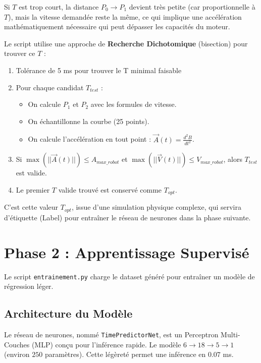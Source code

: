 \documentclass[12pt]{report}
\theoremstyle{plain}
\begin{document}
Si $T$ est trop court, la distance $P_0 \rightarrow P_1$ devient très petite (car proportionnelle à $T$), mais la vitesse demandée reste la même, ce qui implique une accélération mathématiquement nécessaire qui peut dépasser les capacités du moteur.

Le script utilise une approche de \textbf{Recherche Dichotomique} (bisection) pour trouver ce $T$ :

\begin{enumerate}
    \item Tolérance de 5 ms pour trouver le T minimal faisable
    \item Pour chaque candidat $T_{test}$ :
    \begin{itemize}
        \item On calcule $P_1$ et $P_2$ avec les formules de vitesse.
        \item On échantillonne la courbe (25 points).
        \item On calcule l'accélération en tout point : $\vec{A}(t) = \frac{d^2B}{dt^2}$.
    \end{itemize}
    \item Si $\max(||\vec{A}(t)||) \leq A_{max\_robot}$ et $\max(||\vec{V}(t)||) \leq V_{max\_robot}$, alors $T_{test}$ est valide.
    \item Le premier $T$ valide trouvé est conservé comme $T_{opt}$.
\end{enumerate}

C'est cette valeur $T_{opt}$, issue d'une simulation physique complexe, qui servira d'étiquette (Label) pour entraîner le réseau de neurones dans la phase suivante.
















\chapter{Phase 2 : Apprentissage Supervisé}

Le script \texttt{entrainement.py} charge le dataset généré pour entraîner un modèle de régression léger.

\section{Architecture du Modèle}
Le réseau de neurones, nommé \texttt{TimePredictorNet}, est un Perceptron Multi-Couches (MLP) conçu pour l'inférence rapide. Le modèle $6 \rightarrow 18 \rightarrow 5 \rightarrow 1 $  (environ $250$ paramètres). Cette légèreté permet une inférence en $0.07$ ms. 
\end{document}
